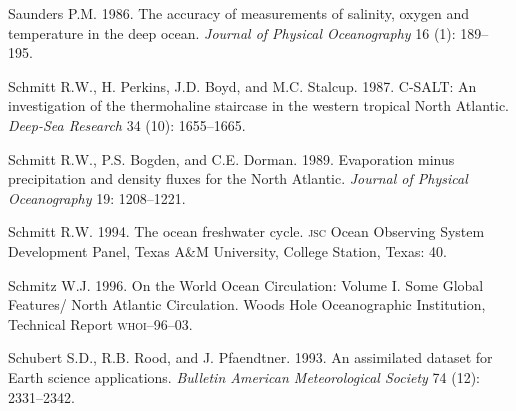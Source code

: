 \begin{thebibliography}{999}
Saunders P.M.  1986. The accuracy of measurements of salinity, oxygen
and temperature in the deep ocean. \textit{Journal of Physical
  Oceanography} 16 (1): 189--195.
%

Schmitt R.W., H. Perkins, J.D. Boyd, and M.C. Stalcup. 1987. C-SALT:
An investigation of the thermohaline staircase in the western tropical
North Atlantic. \textit{Deep-Sea Research} 34 (10): 1655--1665.
%

Schmitt R.W., P.S. Bogden, and C.E. Dorman.  1989. Evaporation minus
precipitation and density fluxes for the North
Atlantic. \textit{Journal of Physical Oceanography} 19: 1208--1221.
%

Schmitt R.W.  1994. The ocean freshwater cycle. \textsc{jsc} Ocean
Observing System Development Panel, Texas A\&M University, College
Station, Texas: 40.
%

Schmitz W.J.  1996. On the World Ocean Circulation: Volume I. Some
Global Features/ North Atlantic Circulation. Woods Hole Oceanographic
Institution, Technical Report \textsc{whoi}--96--03.
%

Schubert S.D., R.B. Rood, and J. Pfaendtner.  1993. An assimilated
dataset for Earth science applications. \textit{Bulletin American
  Meteorological Society} 74 (12): 2331--2342.
%


\end{thebibliography}

